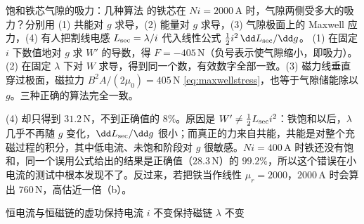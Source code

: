 \begin{example}[label=ex:framework-force]{饱和铁芯气隙的吸力：几种算法}
 的铁芯在 $Ni=2000\,\mathrm A$ 时，气隙两侧受多大的吸力？分别用 (1) 共能对 $g$ 求导，(2) 能量对 $g$ 求导，(3) 气隙极面上的 Maxwell 应力，(4) 有人把割线电感 $L_{\rm sec}=\lambda/i$ 代入线性公式 $\tfrac12i^2\,\dd L_{\rm sec}/\dd g$。
\solution
(1) 在固定 $i$ 下数值地对 $g$ 求 $W'$ 的导数，得 $F=-405\,\mathrm N$（负号表示使气隙缩小，即吸力）。(2) 在固定 $\lambda$ 下对 $W$ 求导，得到同一个数，有效数字全部一致。(3) 磁力线垂直穿过极面，磁拉力 $B^2A/(2\mu_0)=405\,\mathrm N$ \eqref{eq:maxwellstress}，也等于气隙储能除以 $g$。三种正确的算法完全一致。

(4) 却只得到 $31.2\,\mathrm N$，不到正确值的 $8\%$。原因是 $W'\ne\tfrac12L_{\rm sec}i^2$：铁饱和以后，$\lambda$ 几乎不再随 $g$ 变化，$\dd L_{\rm sec}/\dd g$ 很小；而真正的力来自共能，共能是对整个充磁过程的积分，其中低电流、未饱和阶段对 $g$ 很敏感。$Ni=400\,\mathrm A$ 时铁还没有饱和，同一个误用公式给出的结果是正确值（$28.3\,\mathrm N$）的 $99.2\%$，所以这个错误在小电流的测试中根本发现不了。反过来，若把铁当作线性 $\mu_r=2000$，$2000\,\mathrm A$ 时会算出 $760\,\mathrm N$，高估近一倍（b）。
\end{example}


\begin{compare}{恒电流与恒磁链的虚功}{保持电流 $i$ 不变}{保持磁链 $\lambda$ 不变}
\end{compare}

